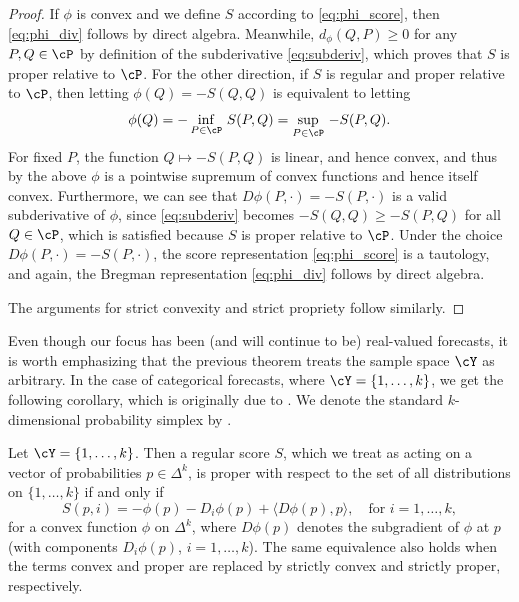 \documentclass{article}
\begin{document}
\begin{proof}
If $\phi$ is convex and we define $S$ according to \eqref{eq:phi_score}, then
\eqref{eq:phi_div} follows by direct algebra. Meanwhile, $d_\phi(Q, P) \geq 0$
for any $P,Q \in \cP$ by definition of the subderivative \eqref{eq:subderiv},
which proves that $S$ is proper relative to $\cP$. For the other direction, if
$S$ is regular and proper relative to $\cP$, then letting $\phi(Q) = -S(Q, Q)$
is equivalent to letting  
\[
\phi(Q) = -\inf_{P \in \cP} \, S(P, Q) = \sup_{P \in \cP} \, -S(P, Q).
\]
For fixed $P$, the function $Q \mapsto -S(P, Q)$ is linear, and hence convex,
and thus by the above $\phi$ is a pointwise supremum of convex functions and
hence itself convex. Furthermore, we can see that $D\phi(P, \cdot) = -S(P,
\cdot)$ is a valid subderivative of $\phi$, since \eqref{eq:subderiv} becomes 
$-S(Q, Q) \geq -S(P, Q)$ for all $Q \in \cP$, which is satisfied because $S$ is 
proper relative to $\cP$. Under the choice $D\phi(P, \cdot) = -S(P, \cdot)$, the 
score representation \eqref{eq:phi_score} is a tautology, and again, the Bregman
representation \eqref{eq:phi_div} follows by direct algebra.

The arguments for strict convexity and strict propriety follow similarly.
\end{proof}

Even though our focus has been (and will continue to be) real-valued forecasts,
it is worth emphasizing that the previous theorem treats the sample space $\cY$
as arbitrary. In the case of categorical forecasts, where $\cY = \{1,\dots,k\}$,
we get the following corollary, which is originally due to 
\citet{savage1971elicitation}. We denote the standard $k$-dimensional 
probability simplex by .

\begin{corollary}
Let $\cY = \{1,\dots,k\}$. Then a regular score $S$, which we treat as acting on
a vector of probabilities $p \in \Delta^k$, is proper with respect to the set of
all distributions on $\{1,\dots,k\}$ if and only if 
\[
S(p, i) = -\phi(p) - D_i\phi(p) + \langle D\phi(p), p \rangle , \quad \text{for
  $i=1,\dots,k$},
\]
for a convex function $\phi$ on $\Delta^k$, where $D\phi(p)$ denotes the
subgradient of $\phi$ at $p$ (with components $D_i\phi(p)$, $i=1,\dots,k$). The
same equivalence also holds when the terms convex and proper are replaced by
strictly convex and strictly proper, respectively.     
\end{corollary}
\end{document}
